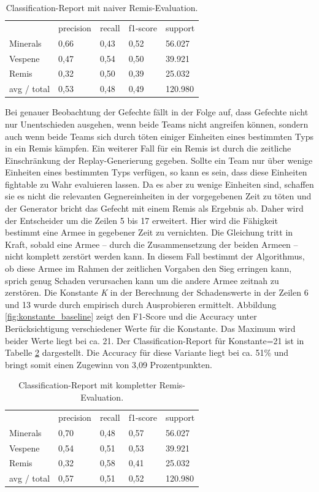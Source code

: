 \begin{table}
\centering
\caption{Classification-Report mit naiver Remis-Evaluation.}
\begin{tabular}{@{}lllll@{}}
\hline
& precision & recall & f1-score & support\\
Minerals & 0,66 & 0,43 & 0,52 & 56.027\\
Vespene & 0,47 & 0,54 & 0,50 & 39.921\\
Remis & 0,32 & 0,50 & 0,39 & 25.032\\
 avg / total & 0,53 & 0,48 & 0,49 & 120.980\\
\hline
\end{tabular}
\label{tb:classificationmitremisnaiv}
\end{table}

Bei genauer Beobachtung der Gefechte fällt in der Folge auf, dass Gefechte nicht nur Unentschieden ausgehen, wenn beide Teams nicht angreifen können, sondern auch wenn beide Teams sich durch töten einiger Einheiten eines bestimmten Typs in ein Remis kämpfen. Ein weiterer Fall für ein Remis ist durch die zeitliche Einschränkung der Replay-Generierung gegeben. Sollte ein Team nur über wenige Einheiten eines bestimmten Typs verfügen, so kann es sein, dass diese Einheiten fightable zu Wahr evaluieren lassen. Da es aber zu wenige Einheiten sind, schaffen sie es nicht die relevanten Gegnereinheiten in der vorgegebenen Zeit zu töten und der Generator bricht das Gefecht mit einem Remis als Ergebnis ab. Daher wird der Entscheider um die Zeilen 5 bis 17 erweitert. Hier wird die Fähigkeit bestimmt eine Armee in gegebener Zeit zu vernichten. Die Gleichung tritt in Kraft, sobald eine Armee -- durch die Zusammensetzung der beiden Armeen -- nicht komplett zerstört werden kann. In diesem Fall bestimmt der Algorithmus, ob diese Armee im Rahmen der zeitlichen Vorgaben den Sieg erringen kann, sprich genug Schaden verursachen kann um die andere Armee zeitnah zu zerstören. Die Konstante \textit{K} in der Berechnung der Schadenswerte in der Zeilen 6 und 13 wurde durch empirisch durch Ausprobieren ermittelt. Abbildung \ref{fig:konstante_baseline} zeigt den F1-Score und die Accuracy unter Berücksichtigung verschiedener Werte für die Konstante. Das Maximum wird beider Werte liegt bei ca. 21. Der Classification-Report für Konstante=21 ist in Tabelle \ref{tb:classificationcomplete} dargestellt. Die Accuracy für diese Variante liegt bei ca. 51\% und bringt somit einen Zugewinn von 3,09 Prozentpunkten.

\begin{table}
\centering
\caption{Classification-Report mit kompletter Remis-Evaluation.}
\begin{tabular}{@{}lllll@{}}
\hline
& precision & recall & f1-score & support\\
Minerals & 0,70 & 0,48 & 0,57 & 56.027\\
Vespene & 0,54 & 0,51 & 0,53 & 39.921\\
Remis & 0,32 & 0,58 & 0,41 & 25.032\\
 avg / total & 0,57 & 0,51 & 0,52 & 120.980\\
\hline
\end{tabular}
\label{tb:classificationcomplete}
\end{table}

